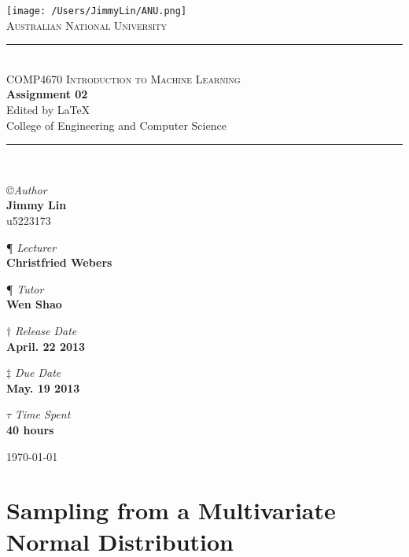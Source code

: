 \documentclass[11pt,a4paper]{article}
\newcommand{\AUTHOR}{Jimmy Lin}
\newcommand{\UID}{u5223173}
\newcommand{\UNIVERSITY}{Australian National University}
\newcommand{\COLLEGE}{College of Engineering and Computer Science}
\newcommand{\COURSE}{COMP4670 Introduction to Machine Learning}
\newcommand{\LECTURER}{Christfried Webers}
\newcommand{\TUTOR}{Wen Shao}
\newcommand{\TASK}{Assignment 02}
\newcommand{\RELEASEDATE}{April. 22 2013}
\newcommand{\DUEDATE}{May. 19 2013}
\newcommand{\TIMECONSUME}{40 hours}
\begin{document}
\begin{titlepage}
    \begin{center}
        \vspace*{0.5cm}
\texttt{[image: /Users/JimmyLin/ANU.png]}\\[1cm]
\textsc{\LARGE \UNIVERSITY}\\[1.2cm]

\rule{\linewidth}{0.5mm} \\[0.4cm]
{ \textsc{\Large \COURSE}\\[0.5cm]
 \huge \bfseries \TASK}\\[0.4cm]
 \footnotesize Edited by \LaTeX \\[0.25cm]
 \normalsize{\COLLEGE}
\rule{\linewidth}{0.5mm} \\[2cm]

\begin{center}
\copyright \emph{\large Author} \\
\Large \textbf{\AUTHOR} \\ \UID \vspace*{0.6cm}

\P \emph{ Lecturer} \\
\Large \textbf{\LECTURER} \vspace*{0.6cm}

\P \emph{ Tutor} \\
\Large \textbf{\TUTOR} \vspace*{0.6cm}

$\dagger$ \emph{Release Date}  \\
\Large \textbf{\RELEASEDATE} \vspace*{0.6cm} 

$\ddagger$ \emph{Due Date}  \\
\Large \textbf{\DUEDATE} \vspace*{0.6cm}

$\tau$ \emph{Time Spent} \\
\Large \textbf{\TIMECONSUME} \vspace*{0.6cm} 
\end{center}
\vfill
{\large \today}
\end{center}
\end{titlepage}
\begin{center} \tableofcontents \end{center}
\newpage
\section{Sampling from a Multivariate Normal Distribution}
\end{document}
